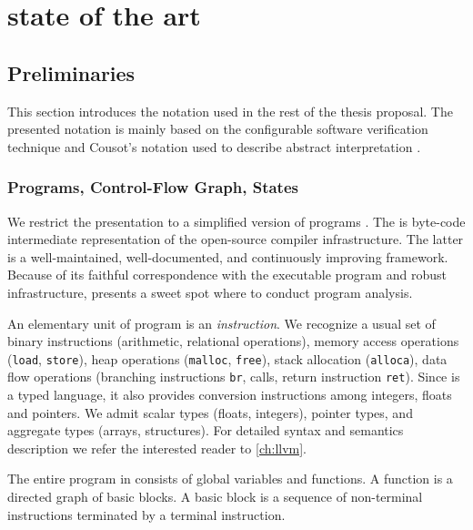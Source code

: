 \chapter{state of the art}
\label{ch:state}


\section{Preliminaries}
\label{sec:preliminaries}

This section introduces the notation used in the rest of the thesis proposal.
The presented notation is mainly based on the configurable software
verification technique \cite{Beyer2007, Beyer2018, Beyer2018b} and Cousot's
notation used to describe abstract interpretation \cite{Cousot2012}.

\subsection{Programs, Control-Flow Graph, States}

We restrict the presentation to a simplified version of \llvmir programs
\cite{Lattner04}. The \llvmir is byte-code intermediate representation of the
open-source \llvm compiler infrastructure.  The latter is a well-main\-tained,
well-documented, and continuously improving framework. Because of its faithful
correspondence with the executable program and robust infrastructure, \llvm
presents a sweet spot where to conduct program analysis.

An elementary unit of \llvm program is an \emph{instruction}. We recognize a usual set of binary
instructions (arithmetic, relational operations), memory access operations
(\texttt{load}, \texttt{store}), heap operations (\texttt{malloc},
\texttt{free}), stack allocation (\texttt{alloca}), data flow operations
(branching instructions \texttt{br}, calls, return instruction \texttt{ret}).
Since \llvmir is a typed language, it also provides conversion instructions
among integers, floats and pointers. We admit scalar types (floats, integers),
pointer types, and aggregate types (arrays, structures).  For detailed syntax
and semantics description we refer the interested reader to \autoref{ch:llvm}.

The entire program in \llvm consists of global variables and functions.  A
function is a directed graph of basic blocks. A basic block is a sequence of
non-terminal instructions terminated by a terminal instruction.

